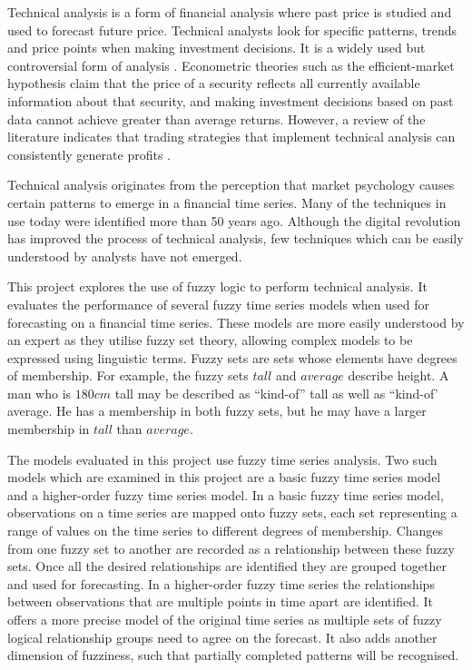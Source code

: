 \documentclass[12pt, oneside, a4paper]{article}
\theoremstyle{definition}
\begin{document}
Technical analysis is a form of financial analysis where past price is studied and used to forecast future price. Technical analysts look for specific patterns, trends and price points when making investment decisions. It is a widely used but controversial form of analysis \citep{foundations}. Econometric theories such as the efficient-market hypothesis claim that the price of a security reflects all currently available information about that security, and making investment decisions based on past data cannot achieve greater than average returns. However, a review of the literature indicates that trading strategies that implement technical analysis can consistently generate profits \citep{taprofitability}.

Technical analysis originates from the perception that market psychology causes certain patterns to emerge in a financial time series. Many of the techniques in use today were identified more than 50 years ago. Although the digital revolution has improved the process of technical analysis, few techniques which can be easily understood by analysts have not emerged.

This project explores the use of fuzzy logic to perform technical analysis. It evaluates the performance of several fuzzy time series models when used for forecasting on a financial time series. These models are more easily understood by an expert as they utilise fuzzy set theory, allowing complex models to be expressed using linguistic terms. Fuzzy sets are sets whose elements have degrees of membership. For example, the fuzzy sets $tall$ and $average$ describe height. A man who is $180cm$ tall may be described as ``kind-of'' tall as well as ``kind-of' average. He has a membership in both fuzzy sets, but he may have a larger membership in $tall$ than $average$.

The models evaluated in this project use fuzzy time series analysis. Two such models which are examined in this project are a basic fuzzy time series model and a higher-order fuzzy time series model. In a basic fuzzy time series model, observations on a time series are mapped onto fuzzy sets, each set representing a range of values on the time series to different degrees of membership. Changes from one fuzzy set to another are recorded as a relationship between these fuzzy sets. Once all the desired relationships are identified they are grouped together and used for forecasting. In a higher-order fuzzy time series the relationships between observations that are multiple points in time apart are identified. It offers a more precise model of the original time series as multiple sets of fuzzy logical relationship groups need to agree on the forecast. It also adds another dimension of fuzziness, such that partially completed patterns will be recognised. 
\end{document}
